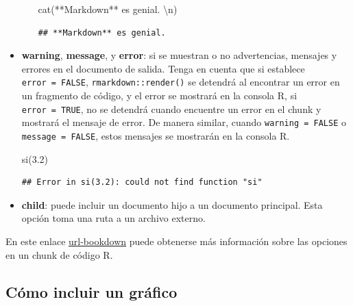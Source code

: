 \documentclass[12pt,a4paper,oneside,]{article}
\newenvironment{Shaded}{\begin{snugshade}}{\end{snugshade}}
\newcommand{\FloatTok}[1]{\textcolor[rgb]{0.00,0.00,0.81}{#1}}
\newcommand{\FunctionTok}[1]{\textcolor[rgb]{0.00,0.00,0.00}{#1}}
\newcommand{\NormalTok}[1]{#1}
\newcommand{\SpecialCharTok}[1]{\textcolor[rgb]{0.00,0.00,0.00}{#1}}
\newcommand{\StringTok}[1]{\textcolor[rgb]{0.31,0.60,0.02}{#1}}
\numberwithin{dummy}{section}
\theoremstyle{ocrenumbox}
\theoremstyle{blacknumex}
\theoremstyle{blacknumbox}
\theoremstyle{ocrenum}
\theoremstyle{ocrenum}
\newenvironment{markdownsal}{\begin{mBox}}{\end{mBox}}
\newcommand{\bmarkdownsal}{\begin{markdownsal}}
\newcommand{\emarkdownsal}{\end{markdownsal}}
\begin{document}
\begin{itemize}
\begin{itemize}
    \bmarkdownsal

\begin{Shaded}
\begin{Highlighting}[]
\FunctionTok{cat}\NormalTok{(}\StringTok{\textquotesingle{}**Markdown** es genial. }\SpecialCharTok{\textbackslash{}n}\StringTok{\textquotesingle{}}\NormalTok{)}
\end{Highlighting}
\end{Shaded}

\begin{verbatim}
## **Markdown** es genial.
\end{verbatim}

    \emarkdownsal
  \end{itemize}
\item
  \textbf{warning}, \textbf{message}, y \textbf{error}: si se muestran o
  no advertencias, mensajes y errores en el documento de salida. Tenga
  en cuenta que si establece \texttt{error\ =\ FALSE},
  \texttt{rmarkdown::render()} se detendrá al encontrar un error en un
  fragmento de código, y el error se mostrará en la consola R, si
  \texttt{error\ =\ TRUE}, no se detendrá cuando encuentre un error en
  el chunk y mostrará el mensaje de error. De manera similar, cuando
  \texttt{warning\ =\ FALSE} o \texttt{message\ =\ FALSE}, estos
  mensajes se mostrarán en la consola R.

  \bmarkdownsal

\begin{Shaded}
\begin{Highlighting}[]
\FunctionTok{si}\NormalTok{(}\FloatTok{3.2}\NormalTok{)}
\end{Highlighting}
\end{Shaded}

\begin{verbatim}
## Error in si(3.2): could not find function "si"
\end{verbatim}

  \emarkdownsal
\item
  \textbf{child}: puede incluir un documento hijo a un documento
  principal. Esta opción toma una ruta a un archivo externo.
\end{itemize}

En este enlace
\href{https://bookdown.org/yihui/rmarkdown/r-code.html}{url-bookdown}
puede obtenerse más información sobre las opciones en un chunk de código
R.

\hypertarget{sec:incluirgrafico}{%
\subsection{Cómo incluir un gráfico}\label{sec:incluirgrafico}}
\end{document}
